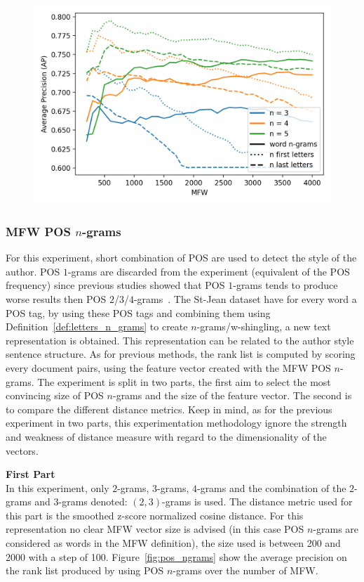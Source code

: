 \begin{figure}
  \label{fig:first_last_letters_ngrams_st_jean}
  \includegraphics[width=\linewidth]{img/first_last_letters_ngrams_st_jean.png}
\end{figure}

\subsubsection{MFW POS $n$-grams}

For this experiment, short combination of POS are used to detect the style of the author.
POS $1$-grams are discarded from the experiment (equivalent of the POS frequency) since previous studies showed that POS $1$-grams tends to produce worse results then POS $2$/$3$/$4$-grams~\cite{kocher_linking}.
The St-Jean dataset have for every word a POS tag, by using these POS tags and combining them using Definition~\ref{def:letters_n_grams} to create $n$-grams/w-shingling, a new text representation is obtained.
This representation can be related to the author style sentence structure.
As for previous methods, the rank list is computed by scoring every document pairs, using the feature vector created with the MFW POS $n$-grams.
The experiment is split in two parts, the first aim to select the most convincing size of POS $n$-grams and the size of the feature vector.
The second is to compare the different distance metrics.
Keep in mind, as for the previous experiment in two parts, this experimentation methodology ignore the strength and weakness of distance measure with regard to the dimensionality of the vectors.

\textbf{First Part}\\
In this experiment, only $2$-grams, $3$-grams, $4$-grams and the combination of the $2$-grams and $3$-grams denoted: $(2, 3)$-grams is used.
The distance metric used for this part is the smoothed z-score normalized cosine distance.
For this representation no clear MFW vector size is advised (in this case POS $n$-grams are considered as words in the MFW definition), the size used is between 200 and 2000 with a step of 100.
Figure~\ref{fig:pos_ngrams} show the average precision on the rank list produced by using POS $n$-grams over the number of MFW.

